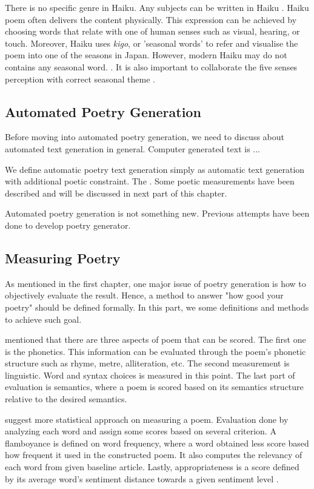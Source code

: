 There is no specific genre in Haiku. Any subjects can be written in Haiku \cite{Haiku_JP}. Haiku poem often delivers the content physically. This expression can be achieved by choosing words that relate with one of human senses such as visual, hearing, or touch. Moreover, Haiku uses \textit{kigo}, or 'seasonal words' to refer and visualise the poem into one of the seasons in Japan. However, modern Haiku may do not contains any seasonal word. \cite{Haiku_JP}. It is also important to collaborate the five senses perception with correct seasonal theme \cite{Haiku_poet}.

\subsection{Automated Poetry Generation}

Before moving into automated poetry generation, we need to discuss about automated text generation in general. Computer generated text is ...

We define automatic poetry text generation simply as automatic text generation with additional poetic constraint. The . Some poetic measurements have been described and will be discussed in next part of this chapter.

Automated poetry generation is not something new. Previous attempts have been done to develop poetry generator. 

\subsection{Measuring Poetry}

As mentioned in the first chapter, one major issue of poetry generation is how to objectively evaluate the result. Hence, a method to answer "how good your poetry" should be defined formally. In this part, we some definitions and methods to achieve such goal.

\citeauthor{manurung2000towards} mentioned that there are three aspects of poem that can be scored. The first one is the phonetics. This information can be evaluated through the poem's phonetic structure such as rhyme, metre, alliteration, etc. The second measurement is linguistic. Word and syntax choices is measured in this point. The last part of evaluation is semantics, where a poem is scored based on its semantics structure relative to the desired semantics\cite{manurung2000towards}.

 \citeauthor{colton2012full} suggest more statistical approach on measuring a poem. Evaluation done by analyzing each word and assign some scores based on several criterion. A flamboyance is defined on word frequency, where a word obtained less score based how frequent it used in the constructed poem. It also computes the relevancy of each word from given baseline article. Lastly, appropriateness is a score defined by its average word's sentiment distance towards a given sentiment level \cite{colton2012full}.




